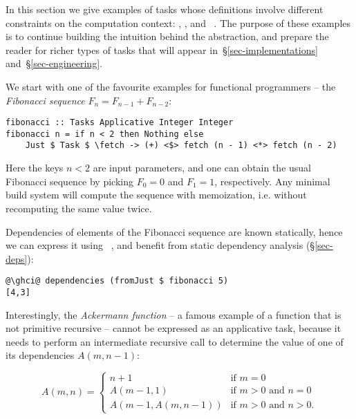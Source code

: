 In this section we give examples of tasks whose definitions involve different
constraints on the computation context: , ,
 and ~. The purpose of these examples is to
continue building the intuition behind the  abstraction, and prepare
the reader for richer types of tasks that will appear
in~\S\ref{sec-implementations} and~\S\ref{sec-engineering}.

We start with one of the favourite examples for functional
programmers -- the \emph{Fibonacci sequence} $F_n = F_{n-1} + F_{n-2}$:

\vspace{1mm}
\begin{verbatim}
fibonacci :: Tasks Applicative Integer Integer
fibonacci n = if n < 2 then Nothing else
    Just $ Task $ \fetch -> (+) <$> fetch (n - 1) <*> fetch (n - 2)
\end{verbatim}
\vspace{1mm}

\noindent
Here the keys $n < 2$ are input parameters, and one can obtain the usual
Fibonacci sequence by picking $F_0=0$ and $F_1=1$, respectively. Any minimal
build system will compute the sequence with memoization, i.e. without
recomputing the same value twice.

Dependencies of elements of the Fibonacci sequence are known statically, hence
we can express it using ~, and benefit from static
dependency analysis (\S\ref{sec-deps}):

\vspace{1mm}
\begin{verbatim}
@\ghci@ dependencies (fromJust $ fibonacci 5)
[4,3]
\end{verbatim}
\vspace{1mm}

\noindent
Interestingly, the \emph{Ackermann function} -- a famous example of a function
that is not primitive recursive -- cannot be expressed as an applicative task,
because it needs to perform an intermediate recursive call to determine the
value of one of its dependencies $A(m, n-1)$:

\[
A(m, n) = \left\{
\begin{array}{ll}
n+1 & \mbox{if } m = 0 \\
A(m-1, 1) & \mbox{if } m > 0 \mbox{ and } n = 0 \\
A(m-1, A(m, n-1)) & \mbox{if } m > 0 \mbox{ and } n > 0.
\end{array}\right.
\]

